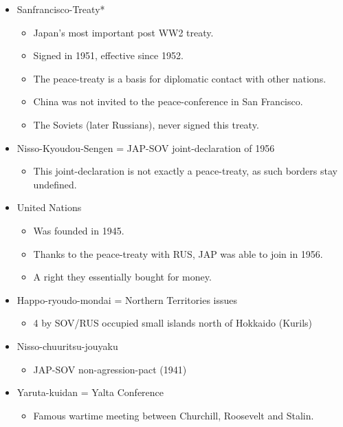 \documentclass{article}
\begin{document}
\begin{itemize}
    \item Sanfrancisco-Treaty*
         \begin{itemize}
               \item Japan's most important post WW2 treaty.
               \item Signed in 1951, effective since 1952. 
               \item The peace-treaty is a basis for diplomatic contact with other nations. 
               \item China was not invited to the peace-conference in San Francisco. 
               \item The Soviets (later Russians), never signed this treaty.
         \end{itemize}
    \item Nisso-Kyoudou-Sengen = JAP-SOV joint-declaration of 1956
         \begin{itemize}
               \item This joint-declaration is not exactly a peace-treaty, as such borders stay undefined.
         \end{itemize}
    \item United Nations
         \begin{itemize}
               \item Was founded in 1945.
               \item Thanks to the peace-treaty with RUS, JAP was able to join in 1956.
               \item A right they essentially bought for money.
         \end{itemize}
    \item Happo-ryoudo-mondai = Northern Territories issues
         \begin{itemize}
               \item 4 by SOV/RUS occupied small islands north of Hokkaido (Kurils)
         \end{itemize}
    \item Nisso-chuuritsu-jouyaku
         \begin{itemize}
               \item JAP-SOV non-agression-pact (1941)
         \end{itemize}
    \item Yaruta-kuidan = Yalta Conference
         \begin{itemize}
               \item Famous wartime meeting between Churchill, Roosevelt and Stalin.

\end{itemize}
\end{itemize}
\end{document}
